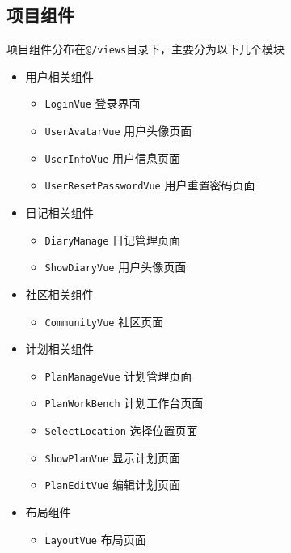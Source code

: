 \documentclass{report}
\begin{document}
\subsection{项目组件}
项目组件分布在\verb|@/views|目录下，主要分为以下几个模块
\begin{itemize}
    \item 用户相关组件
    \begin{itemize}
        \item \verb|LoginVue| 登录界面
        \item \verb|UserAvatarVue| 用户头像页面
        \item \verb|UserInfoVue| 用户信息页面
        \item \verb|UserResetPasswordVue| 用户重置密码页面
    \end{itemize}
    \item 日记相关组件
    \begin{itemize}
        \item \verb|DiaryManage| 日记管理页面
        \item \verb|ShowDiaryVue| 用户头像页面
    \end{itemize}
    \item 社区相关组件
    \begin{itemize}
        \item \verb|CommunityVue| 社区页面
    \end{itemize}
    \item 计划相关组件
    \begin{itemize}
        \item \verb|PlanManageVue| 计划管理页面
        \item \verb|PlanWorkBench| 计划工作台页面
        \item \verb|SelectLocation| 选择位置页面
        \item \verb|ShowPlanVue| 显示计划页面
        \item \verb|PlanEditVue| 编辑计划页面
    \end{itemize}
    \item 布局组件
    \begin{itemize}
        \item \verb|LayoutVue| 布局页面
    \end{itemize}
\end{itemize}
\end{document}
